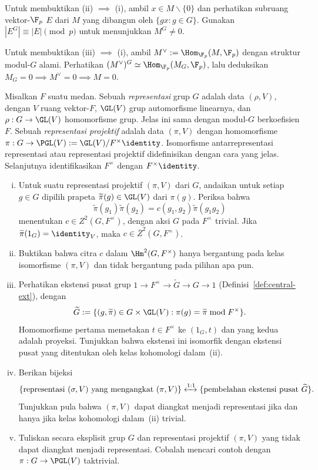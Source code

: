 \begin{Exercises}
	\begin{hint}
		Untuk membuktikan (ii) $\implies$ (i), ambil
		$x\in M\smallsetminus\{0\}$ dan perhatikan subruang vektor-$\F_p$ $E$
		dari $M$ yang dibangun oleh $\{gx:g\in G\}$. Gunakan
		$|E^G|\equiv|E|\pmod p$ untuk menunjukkan $M^G\neq0$.

		Untuk membuktikan (iii) $\implies$ (i), ambil
		$M^\vee:=\Hom_{\F_p}(M,\F_p)$ dengan struktur modul-$G$ alami.
		Perhatikan
		$(M^\vee)^G\simeq\Hom_{\F_p}(M_G,\F_p)$, lalu deduksikan
		$M_G=0\implies M^\vee=0\implies M=0$.
	\end{hint}

	\item Misalkan $F$ suatu medan. Sebuah \emph{representasi} grup $G$ adalah data
	$(\rho,V)$, dengan $V$ ruang vektor-$F$, $\GL(V)$ grup automorfisme
	linearnya, dan $\rho:G\to\GL(V)$ homomorfisme grup. Jelas ini sama dengan
	modul-$G$ berkoefisien $F$. Sebuah \emph{representasi projektif} adalah
	data $(\pi,V)$ dengan homomorfisme
	$\pi:G\to\PGL(V):=\GL(V)/F^\times\identity$. Isomorfisme antarrepresentasi
	representasi atau representasi projektif didefinisikan dengan cara yang
	jelas. Selanjutnya identifikasikan $F^\times$ dengan
	$F^\times\identity$.

	\begin{enumerate}[(i)]
		\item Untuk suatu representasi projektif $(\pi,V)$ dari $G$, andaikan
		untuk setiap $g\in G$ dipilih prapeta
		$\widetilde\pi(g)\in\GL(V)$ dari $\pi(g)$. Periksa bahwa
		\[ \widetilde\pi(g_1)\widetilde\pi(g_2)
		=c(g_1,g_2)\widetilde\pi(g_1g_2) \]
		menentukan $c\in Z^2(G,F^\times)$, dengan aksi $G$ pada $F^\times$
		trivial. Jika $\widetilde\pi(1_G)=\identity_V$, maka
		$c\in\overline{Z}^2(G,F^\times)$.
		\item Buktikan bahwa citra $c$ dalam $\Hm^2(G,F^\times)$ hanya bergantung
		pada kelas isomorfisme $(\pi,V)$ dan tidak bergantung pada pilihan apa
		pun.
		\item Perhatikan ekstensi pusat grup
		$1\to F^\times\to\widetilde G\to G\to1$
		(Definisi~\ref{def:central-ext}), dengan
		\[ \widetilde G:=\{(g,\widetilde\pi)\in G\times\GL(V):
		\pi(g)=\widetilde\pi\bmod F^\times\}. \]
		Homomorfisme pertama memetakan $t\in F^\times$ ke $(1_G,t)$ dan yang
		kedua adalah proyeksi. Tunjukkan bahwa ekstensi ini isomorfik dengan
		ekstensi pusat yang ditentukan oleh kelas kohomologi dalam~(ii).
		\item Berikan bijeksi
		\[ \{\text{representasi }(\sigma,V)\text{ yang mengangkat }(\pi,V)\}
		\xleftrightarrow{1:1}
		\{\text{pembelahan ekstensi pusat }\widetilde G\}. \]
		Tunjukkan pula bahwa $(\pi,V)$ dapat diangkat menjadi representasi jika
		dan hanya jika kelas kohomologi dalam~(ii) trivial.
		\item Tuliskan secara eksplisit grup $G$ dan representasi projektif
		$(\pi,V)$ yang tidak dapat diangkat menjadi representasi. Cobalah mencari
		contoh dengan $\pi:G\to\PGL(V)$ taktrivial.
	\end{enumerate}


\end{Exercises}
